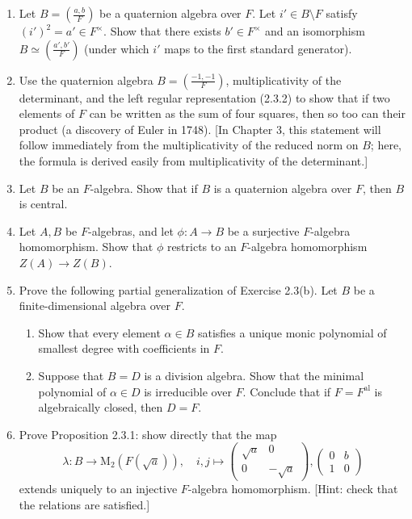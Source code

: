\documentclass{article}
\theoremstyle{definition}
\begin{document}
\begin{enumerate}
\item Let $B = \left(\frac{a, b}{F}\right)$ be a quaternion algebra over $F$. Let $i' \in B \setminus F$ satisfy $(i')^2 = a' \in F^\times$. Show that there exists $b' \in F^\times$ and an isomorphism $B \simeq \left(\frac{a', b'}{F}\right)$ (under which $i'$ maps to the first standard generator).

\item Use the quaternion algebra $B = \left(\frac{-1, -1}{F}\right)$, multiplicativity of the determinant, and the left regular representation (2.3.2) to show that if two elements of $F$ can be written as the sum of four squares, then so too can their product (a discovery of Euler in 1748). [In Chapter 3, this statement will follow immediately from the multiplicativity of the reduced norm on $B$; here, the formula is derived easily from multiplicativity of the determinant.]

\item Let $B$ be an $F$-algebra. Show that if $B$ is a quaternion algebra over $F$, then $B$ is central.

\item Let $A, B$ be $F$-algebras, and let $\phi : A \to B$ be a surjective $F$-algebra homomorphism. Show that $\phi$ restricts to an $F$-algebra homomorphism $Z(A) \to Z(B)$.

\item Prove the following partial generalization of Exercise 2.3(b). Let $B$ be a finite-dimensional algebra over $F$.
\begin{enumerate}[label=(\alph*)]
\item Show that every element $\alpha \in B$ satisfies a unique monic polynomial of smallest degree with coefficients in $F$.
\item Suppose that $B = D$ is a division algebra. Show that the minimal polynomial of $\alpha \in D$ is irreducible over $F$. Conclude that if $F = F^{\text{al}}$ is algebraically closed, then $D = F$.
\end{enumerate}

\item Prove Proposition 2.3.1: show directly that the map
$$\lambda: B \rightarrow \mathrm{M}_2(F(\sqrt{a})), \quad i, j \mapsto \begin{pmatrix} \sqrt{a} & 0 \\ 0 & -\sqrt{a} \end{pmatrix}, \begin{pmatrix} 0 & b \\ 1 & 0 \end{pmatrix}$$
extends uniquely to an injective $F$-algebra homomorphism. [Hint: check that the relations are satisfied.]


\end{enumerate}
\end{document}
